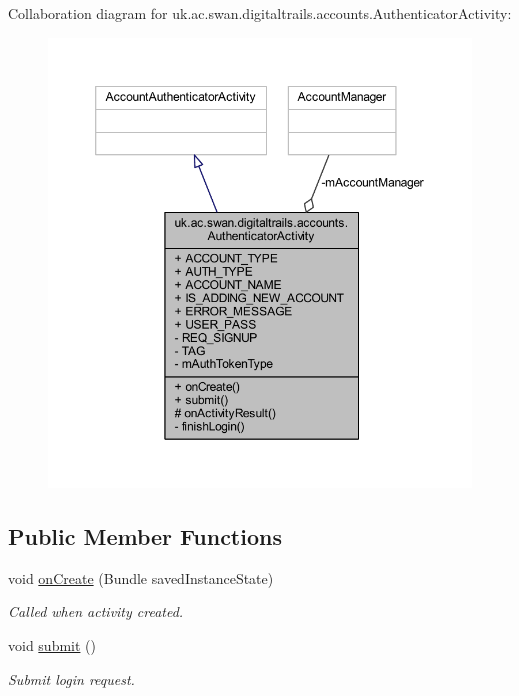 Collaboration diagram for uk.\+ac.\+swan.\+digitaltrails.\+accounts.\+Authenticator\+Activity\+:
\nopagebreak
\begin{figure}[H]
\begin{center}
\leavevmode
\includegraphics[width=350pt]{classuk_1_1ac_1_1swan_1_1digitaltrails_1_1accounts_1_1_authenticator_activity__coll__graph}
\end{center}
\end{figure}
\subsection*{Public Member Functions}
\begin{DoxyCompactItemize}
\item 
void \hyperlink{classuk_1_1ac_1_1swan_1_1digitaltrails_1_1accounts_1_1_authenticator_activity_a552d0ee1b418814c3a97cf21ca1c038c}{on\+Create} (Bundle saved\+Instance\+State)
\begin{DoxyCompactList}\small\item\em Called when activity created. \end{DoxyCompactList}\item 
void \hyperlink{classuk_1_1ac_1_1swan_1_1digitaltrails_1_1accounts_1_1_authenticator_activity_a771eb6c281eece044fa2884364472850}{submit} ()
\begin{DoxyCompactList}\small\item\em Submit login request. \end{DoxyCompactList}\end{DoxyCompactItemize}
